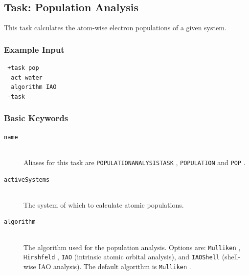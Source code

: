 \documentclass[bibliography=totocnumbered,a4paper,10pt,oneside]{scrbook}
\newcommand{\ttt}[1]{%
  \begingroup\setlength{\fboxsep}{1pt}%
  \colorbox{serenity-green!30}{\texttt{\hspace*{2pt}\vphantom{(g}#1\hspace*{2pt}}}%
  \endgroup
}
\begin{document}
\subsection{Task: Population Analysis}

This task calculates the atom-wise electron populations of a given system.
\subsubsection{Example Input}
\begin{lstlisting}
 +task pop
  act water
  algorithm IAO
 -task
\end{lstlisting}

\subsubsection{Basic Keywords}
\begin{description}
 \item [\texttt{name}]\hfill \\
  Aliases for this task are \ttt{POPULATIONANALYSISTASK}, \ttt{POPULATION} and \ttt{POP}.
 \item [\texttt{activeSystems}]\hfill \\
  The system of which to calculate atomic populations.
 \item [\texttt{algorithm}]\hfill \\
  The algorithm used for the population analysis.
  Options are: \ttt{Mulliken}, \ttt{Hirshfeld}, \ttt{IAO} (intrinsic atomic orbital analysis),
  and \ttt{IAOShell} (shell-wise IAO analysis). The default algorithm is \ttt{Mulliken}.
\end{description}
\end{document}
